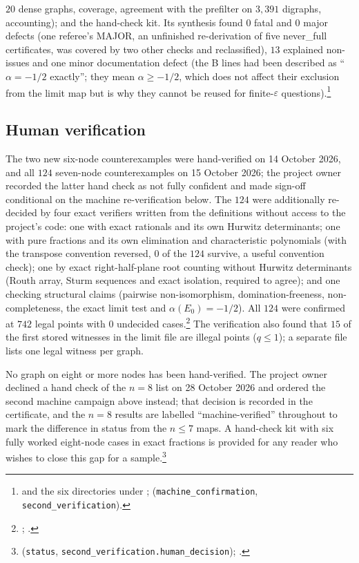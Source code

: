 \documentclass[11pt]{article}
\theoremstyle{definition}
\newcommand{\eps}{\varepsilon}
\begin{document}
{$20$ dense graphs, coverage, agreement with the prefilter on $3{,}391$ digraphs, accounting); and the hand-check kit. Its
synthesis found $0$ fatal and $0$ major defects (one referee's MAJOR, an unfinished re-derivation of five never\_full
certificates, was covered by two other checks and reclassified), $13$ explained non-issues and one minor documentation defect (the B lines
had been described as ``$\alpha=-1/2$ exactly''; they mean $\alpha\ge-1/2$, which does not affect their exclusion from the
limit map but is why they cannot be reused for finite-$\eps$ questions).\footnote{ and
the six directories under ;  (\texttt{machine\_confirmation},
\texttt{second\_verification}).}

\subsection{Human verification}
The two new six-node counterexamples were hand-verified on 14 October 2026, and all $124$ seven-node counterexamples on
15 October 2026; the project owner recorded the latter hand check as not fully confident and made sign-off conditional on
the machine re-verification below. The $124$ were additionally re-decided by four exact verifiers written from the definitions without access
to the project's code: one with exact rationals and its own Hurwitz determinants; one with pure fractions and its own
elimination and characteristic polynomials (with the transpose convention reversed, $0$ of the $124$ survive, a useful
convention check); one by exact right-half-plane root counting without Hurwitz determinants (Routh array, Sturm sequences and
exact isolation, required to agree); and one checking structural claims (pairwise non-isomorphism, domination-freeness,
non-completeness, the exact limit test and $\alpha(E_0)=-1/2$). All $124$ were confirmed at $742$ legal points with $0$ undecided
cases.\footnote{; .} The verification also
found that $15$ of the first stored witnesses in the limit file are illegal points ($q\le1$); a separate file lists one legal
witness per graph.

No graph on eight or more nodes has been hand-verified. The project owner declined a hand check of the $n=8$ list on
28 October 2026 and ordered the second machine campaign above instead; that decision is recorded in the certificate, and the
$n=8$ results are labelled ``machine-verified'' throughout to mark the difference in status from the $n\le7$ maps. A
hand-check kit with six fully worked eight-node cases in exact fractions is provided for any reader who wishes to close this
gap for a sample.\footnote{ (\texttt{status}, \texttt{second\_verification.human\_decision});
.}

}
\end{document}
